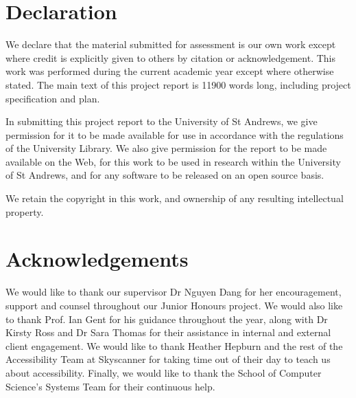 \chapter*{Declaration}
We declare that the material submitted for assessment is our own work except
where credit is explicitly given to others by citation or acknowledgement. This
work was performed during the current academic year except where otherwise
stated. The main text of this project report is 11900 words long,
including project specification and plan.

In submitting this project report to the University of St Andrews, we give
permission for it to be made available for use in accordance with the
regulations of the University Library. We also give permission for the report to
be made available on the Web, for this work to be used in research within the
University of St Andrews, and for any software to be released on an open source
basis.

We retain the copyright in this work, and ownership of any resulting intellectual property.


\chapter*{Acknowledgements}
We would like to thank our supervisor Dr Nguyen Dang for her
encouragement, support and counsel throughout our Junior Honours project. We
would also like to thank Prof. Ian Gent for his guidance throughout the year,
along with Dr Kirsty Ross and Dr Sara Thomas for their assistance in internal
and external client engagement. We would like to thank Heather Hepburn and the
rest of the Accessibility Team at Skyscanner for taking time out of their day
to teach us about accessibility. Finally, we would like to thank the School
of Computer Science's Systems Team for their continuous help.
